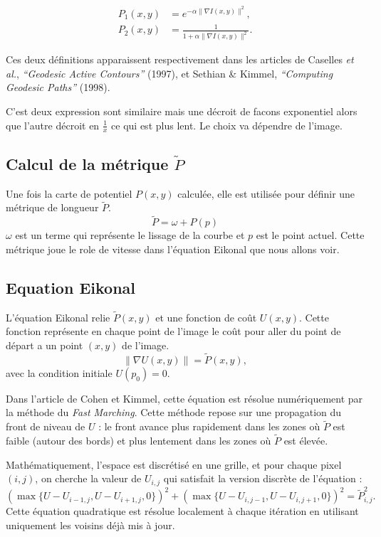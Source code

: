 \documentclass{article}
\begin{document}
\begin{equation}
\begin{aligned}
P_1(x,y) &= e^{-\alpha \|\nabla I(x,y)\|^2}, \\
P_2(x,y) &= \frac{1}{1 + \alpha \|\nabla I(x,y)\|^2}.
\end{aligned}
\end{equation}

Ces deux définitions apparaissent respectivement dans les articles de  
Caselles \textit{et al.}, \textit{“Geodesic Active Contours”} (1997), et  
Sethian \& Kimmel, \textit{“Computing Geodesic Paths”} (1998).

C'est deux expression sont similaire mais une décroit de facons exponentiel 
alors que l'autre décroit en $\frac{1}{x}$ ce qui est plus lent. Le choix va
dépendre de l'image. 

\subsection{Calcul de la métrique $\tilde{P}$}
Une fois la carte de potentiel $P(x,y)$ calculée, elle est utilisée pour définir 
une métrique de longueur $\tilde{P}$. 
\begin{equation}
\tilde{P} = \omega + P(p)
\end{equation}
$\omega$ est un terme qui représente le lissage de la courbe et $p$ est le point actuel.
Cette métrique joue le role de vitesse dans l'équation Eikonal que nous allons voir. 


\subsection{Equation Eikonal}
L'équation Eikonal relie $\tilde{P}(x,y)$ et une fonction de coût $U(x,y)$. Cette fonction
représente en chaque point de l'image le coût pour aller du point de départ a un point $(x,y)$
de l'image.
\begin{equation}
\|\nabla U(x,y)\| = \tilde{P}(x,y),
\end{equation}
avec la condition initiale $U(p_0)=0$.

Dans l’article de Cohen et Kimmel, cette équation est résolue numériquement
par la méthode du \textit{Fast Marching}.
Cette méthode repose sur une propagation du front de niveau de $U$ :
le front avance plus rapidement dans les zones où $\tilde{P}$ est faible (autour des bords)
et plus lentement dans les zones où $\tilde{P}$ est élevée.

Mathématiquement, l’espace est discrétisé en une grille, et pour chaque pixel $(i,j)$,
on cherche la valeur de $U_{i,j}$ qui satisfait la version discrète de l’équation :
\begin{equation}
(\max\{U - U_{i-1,j}, U - U_{i+1,j}, 0\})^2 + 
(\max\{U - U_{i,j-1}, U - U_{i,j+1}, 0\})^2 = \tilde{P}_{i,j}^2.
\end{equation}
Cette équation quadratique est résolue localement à chaque itération
en utilisant uniquement les voisins déjà mis à jour.
\end{document}
